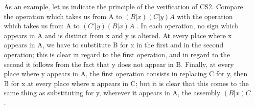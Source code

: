 As an example, let us indicate the principle of the verification of CS2. Compare the operation which takes us from A to \((B|x)(C|y)A\) with the operation which takes us from A to \((C'|y)(B|x)A\) . In each operation, no sign which appears in A and is distinct from x and y is altered. At every place where x appears in A, we have to substitute B for x in the first and in the second operation; this is clear in regard to the first operation, and in regard to the second it follows from the fact that y does not appear in B. Finally, at every place where y appears in A, the first operation consists in replacing C for y, then B for x at every place where x appears in C; but it is clear that this comes to the same thing as substituting for y, wherever it appears in A, the assembly \((B|x)C\) .

